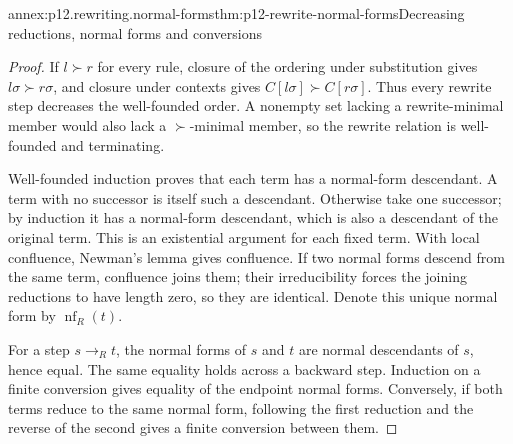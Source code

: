 \begin{annexitem}{annex:p12.rewriting.normal-forms}{thm:p12-rewrite-normal-forms}{Decreasing reductions, normal forms and conversions}
\begin{proof}
If \(l\succ r\) for every rule, closure of the ordering under
substitution gives \(l\sigma\succ r\sigma\), and closure under
contexts gives \(C[l\sigma]\succ C[r\sigma]\). Thus every
rewrite step decreases the well-founded order. A nonempty set lacking
a rewrite-minimal member would also lack a \(\succ\)-minimal
member, so the rewrite relation is well-founded and terminating.

Well-founded induction proves that each term has a normal-form
descendant. A term with no successor is itself such a descendant.
Otherwise take one successor; by induction it has a normal-form
descendant, which is also a descendant of the original term. This is
an existential argument for each fixed term. With local confluence,
Newman's lemma gives confluence. If two normal forms descend from the
same term, confluence joins them; their irreducibility forces the joining
reductions to have length zero, so they are identical. Denote this
unique normal form by \(\operatorname{nf}_R(t)\).

For a step \(s\to_R t\), the normal forms of \(s\) and \(t\)
are normal descendants of \(s\), hence equal. The same equality
holds across a backward step. Induction on a finite conversion gives
equality of the endpoint normal forms. Conversely, if both terms reduce
to the same normal form, following the first reduction and the reverse
of the second gives a finite conversion between them.
\end{proof}
\end{annexitem}

